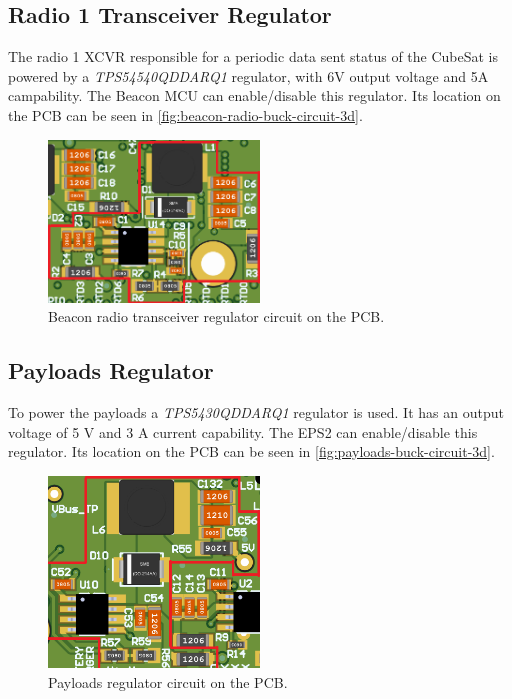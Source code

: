 \subsection{Radio 1 Transceiver Regulator}

The radio 1 XCVR responsible for a periodic data sent status of the CubeSat is powered by a \textit{TPS54540QDDARQ1} regulator, with 6V output voltage and 5A campability. The Beacon MCU can enable/disable this regulator.
Its location on the PCB can be seen in \autoref{fig:beacon-radio-buck-circuit-3d}.

\begin{figure}[!ht]
    \begin{center}
        \includegraphics[width=0.5\textwidth]{figures/beacon-radio-buck-circuit-3d.png}
        \caption{Beacon radio transceiver regulator circuit on the PCB.}
        \label{fig:beacon-radio-buck-circuit-3d}
    \end{center}
\end{figure}

\subsection{Payloads Regulator}

To power the payloads a \textit{TPS5430QDDARQ1} regulator is used. It has an output voltage of 5 V and 3 A current capability. The EPS2 can enable/disable this regulator.
Its location on the PCB can be seen in \autoref{fig:payloads-buck-circuit-3d}.

\begin{figure}[!ht]
    \begin{center}
        \includegraphics[width=0.5\textwidth]{figures/payloads-buck-circuit-3d.png}
        \caption{Payloads regulator circuit on the PCB.}
        \label{fig:payloads-buck-circuit-3d}
    \end{center}
\end{figure}


